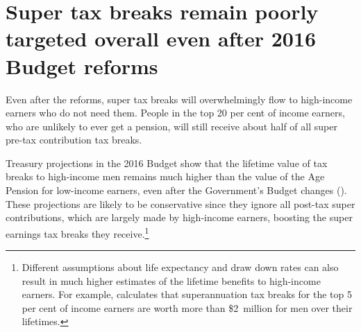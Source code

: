 \documentclass[continuous]{grattan}
\begin{document}
\section{Super tax breaks remain poorly targeted overall even after 2016 Budget reforms}\label{sec:super-tax-breaks-remain-poorly-targeted-overall-even-after-2016-budget-reforms}

Even after the reforms, super tax breaks will overwhelmingly flow to high-income earners who do not need them. 
People in the top 20 per cent of income earners, who are unlikely to ever get a pension, will still receive about half of all super pre-tax contribution tax breaks.

Treasury projections in the 2016 Budget show that the lifetime value of tax breaks to high-income men remains much higher than the value of the Age Pension for low-income earners, even after the Government's Budget changes (). %
These projections are likely to be conservative since they ignore all post-tax super contributions, which are largely made by high-income earners, boosting the super earnings tax breaks they receive.\footnote{Different assumptions about life expectancy and draw down rates can also result in much higher estimates of the lifetime benefits to high-income earners. For example, \textcite{Industry-Super-2015-Off-target-current-settings} calculates that superannuation tax breaks for the top 5 per cent of income earners are worth more than \$2~million for men over their lifetimes.}
\end{document}
